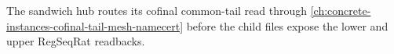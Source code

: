 The sandwich hub routes its cofinal common-tail read through \autoref{ch:concrete-instances-cofinal-tail-mesh-namecert} before the child files expose the lower and upper RegSeqRat readbacks.




